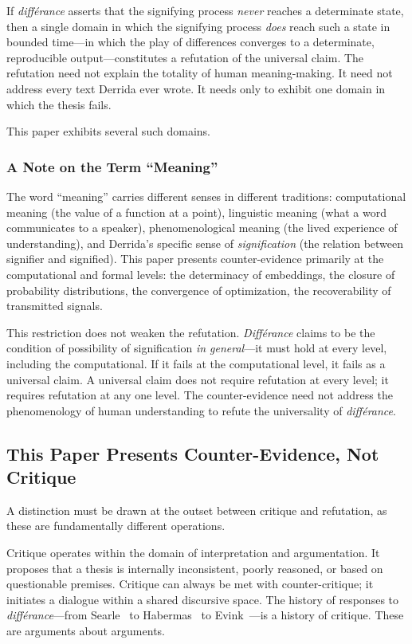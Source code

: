 \documentclass[a4paper,twocolumn,11pt]{article}
\begin{document}
If \emph{diff\'erance} asserts that the signifying process \emph{never} reaches a determinate state, then a single domain in which the signifying process \emph{does} reach such a state in bounded time---in which the play of differences converges to a determinate, reproducible output---constitutes a refutation of the universal claim. The refutation need not explain the totality of human meaning-making. It need not address every text Derrida ever wrote. It needs only to exhibit one domain in which the thesis fails.

This paper exhibits several such domains.

\subsubsection{A Note on the Term ``Meaning''}

The word ``meaning'' carries different senses in different traditions: computational meaning (the value of a function at a point), linguistic meaning (what a word communicates to a speaker), phenomenological meaning (the lived experience of understanding), and Derrida's specific sense of \emph{signification} (the relation between signifier and signified). This paper presents counter-evidence primarily at the computational and formal levels: the determinacy of embeddings, the closure of probability distributions, the convergence of optimization, the recoverability of transmitted signals.

This restriction does not weaken the refutation. \emph{Diff\'erance} claims to be the condition of possibility of signification \emph{in general}---it must hold at every level, including the computational. If it fails at the computational level, it fails as a universal claim. A universal claim does not require refutation at every level; it requires refutation at any one level. The counter-evidence need not address the phenomenology of human understanding to refute the universality of \emph{diff\'erance}.

\subsection{This Paper Presents Counter-Evidence, Not Critique}
\label{sec:not-critique}

A distinction must be drawn at the outset between critique and refutation, as these are fundamentally different operations.

Critique operates within the domain of interpretation and argumentation. It proposes that a thesis is internally inconsistent, poorly reasoned, or based on questionable premises. Critique can always be met with counter-critique; it initiates a dialogue within a shared discursive space. The history of responses to \emph{diff\'erance}---from Searle~\cite{Searle1977} to Habermas~\cite{Habermas1985} to Evink~\cite{Evink2020}---is a history of critique. These are arguments about arguments.
\end{document}
